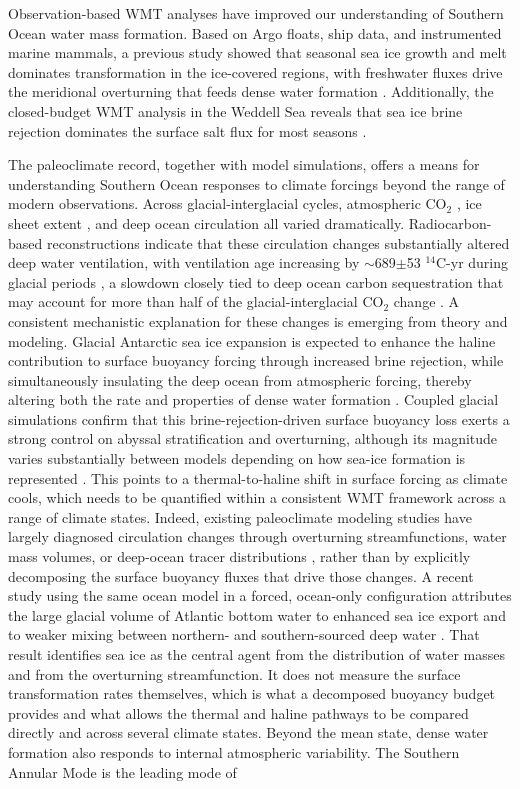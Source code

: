 \documentclass[pdflatex,sn-nature]{sn-jnl}
\begin{document}
Observation-based WMT analyses have improved our understanding of Southern Ocean water mass formation.  Based on Argo floats, ship data, and instrumented marine mammals, a previous study showed that seasonal sea ice growth and melt dominates transformation in the ice-covered regions, with freshwater fluxes drive the meridional overturning that feeds dense water formation \cite{Pellichero2018}. Additionally, the closed-budget WMT analysis in the Weddell Sea reveals that sea ice brine rejection dominates the surface salt flux for most seasons \cite{Bailey2023}.


The paleoclimate record, together with model simulations, offers a means for understanding Southern Ocean responses to climate forcings beyond the range of modern observations. Across glacial-interglacial cycles, atmospheric CO$_2$ \cite{SigmanBoyle2000,Kohfeld2005}, ice sheet extent \cite{huybrechts1990antarctic}, and deep ocean circulation \cite{rafter2022global} all varied dramatically. Radiocarbon-based reconstructions indicate that these circulation changes substantially altered deep water ventilation, with ventilation age increasing by $\sim$689$\pm$53 $^{14}$C-yr during glacial periods \cite{Skinner2017}, a slowdown closely tied to deep ocean carbon sequestration that may account for more than half of the glacial-interglacial CO$_2$ change \cite{Skinner2017}. A consistent mechanistic explanation for these changes is emerging from theory and modeling. Glacial Antarctic sea ice expansion is expected to enhance the haline contribution to surface buoyancy forcing through increased brine rejection, while simultaneously insulating the deep ocean from atmospheric forcing, thereby altering both the rate and properties of dense water formation \cite{Ferrari2014}. Coupled glacial simulations confirm that this brine-rejection-driven surface buoyancy loss exerts a strong control on abyssal stratification and overturning, although its magnitude varies substantially between models depending on how sea-ice formation is represented \cite{Marzocchi2017}. This points to a thermal-to-haline shift in surface forcing as climate cools, which needs to be quantified within a consistent WMT framework across a range of climate states. Indeed, existing paleoclimate modeling studies have largely diagnosed circulation changes through overturning streamfunctions, water mass volumes, or deep-ocean tracer distributions \cite{Weber2007,Wainer2012}, rather than by explicitly decomposing the surface buoyancy fluxes that drive those changes. A recent study using the same ocean model in a forced, ocean-only configuration attributes the large glacial volume of Atlantic bottom water to enhanced sea ice export and to weaker mixing between northern- and southern-sourced deep water \cite{Chen2025}. That result identifies sea ice as the central agent from the distribution of water masses and from the overturning streamfunction. It does not measure the surface transformation rates themselves, which is what a decomposed buoyancy budget provides and what allows the thermal and haline pathways to be compared directly and across several climate states. Beyond the mean state, dense water formation also responds to internal atmospheric variability. The Southern Annular Mode is the leading mode of 
\end{document}
